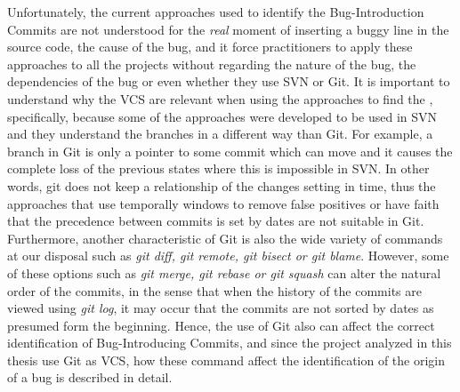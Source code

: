 \documentclass[a4paper, 12pt]{book}
\begin{document}
Unfortunately, the current approaches used to identify the Bug-Introduction Commits are not understood for the \emph{real} moment of inserting a buggy line in the source code, the cause of the bug, and it force practitioners to apply these approaches to all the projects without regarding the nature of the bug, the dependencies of the bug or even whether they use SVN or Git. It is important to understand why the VCS are relevant when using the approaches to find the \BIC, specifically, because some of the approaches were developed to be used in SVN and they understand the branches in a different way than Git. For example, a branch in Git is only a pointer to some commit which can move and it causes the complete loss of the previous states where this is impossible in SVN. In other words, git does not keep a relationship of the changes setting in time, thus the approaches that use temporally windows to remove false positives or have faith that the precedence between commits is set by dates are not suitable in Git. Furthermore, another characteristic of Git is also the wide variety of commands at our disposal such as \emph{git diff, git remote, git bisect or git blame}. However, some of these options such as \emph{git merge, git rebase or git squash} can alter the natural order of the commits, in the sense that when the history of the commits are viewed using \emph{git log}, it may occur that the commits are not sorted by dates as presumed form the beginning. Hence, the use of Git also can affect the correct identification of Bug-Introducing Commits, and since the project analyzed in this thesis use Git as VCS, how these command affect the identification of the origin of a bug is described in detail. %

\end{document}
